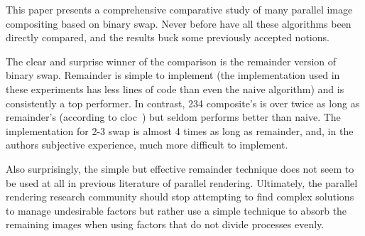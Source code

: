 \documentclass{vgtc}                          %
\newcommand*{\lcite}[1]{~\cite{#1}}
\newcommand{\textalgorithm}[1]{\textsf{#1}\xspace}
\newcommand{\binaryswap}{\textalgorithm{binary swap}}
\newcommand{\ttswap}{\textalgorithm{2-3 swap}}
\newcommand{\naive}{\textalgorithm{naive}}
\newcommand{\remainder}{\textalgorithm{remainder}}
\newcommand{\Remainder}{\textalgorithm{Remainder}}
\newcommand{\ttfcomposite}{\textalgorithm{234 composite}}
\begin{document}
This paper presents a comprehensive comparative study of many parallel image compositing based on \binaryswap.
Never before have all these algorithms been directly compared, and the results buck some previously accepted notions.

The clear and surprise winner of the comparison is the \remainder version of binary swap.
\Remainder is simple to implement (the implementation used in these experiments has less lines of code than even the \naive algorithm) and is consistently a top performer.
In contrast, \ttfcomposite's is over twice as long as \remainder's (according to cloc\lcite{cloc}) but seldom performs better than \naive.
The implementation for \ttswap is almost 4 times as long as \remainder, and, in the authors subjective experience, much more difficult to implement.

Also surprisingly, the simple but effective \remainder technique does not seem to be used at all in previous literature of parallel rendering.
Ultimately, the parallel rendering research community should stop attempting to find complex solutions to manage undesirable factors but rather use a simple technique to absorb the remaining images when using factors that do not divide processes evenly.


%
%

%
%


\end{document}
